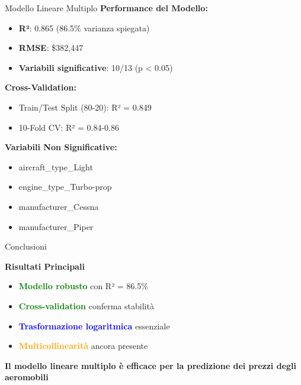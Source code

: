 \documentclass{beamer}
\begin{document}
\begin{frame}{Modello Lineare Multiplo}
\textbf{Performance del Modello:}
\begin{itemize}
    \item \textbf{R²}: 0.865 (86.5\% varianza spiegata)
    \item \textbf{RMSE}: \$382,447
    \item \textbf{Variabili significative}: 10/13 (p < 0.05)
\end{itemize}

\textbf{Cross-Validation:}
\begin{itemize}
    \item Train/Test Split (80-20): R² = 0.849
    \item 10-Fold CV: R² = 0.84-0.86
\end{itemize}

\textbf{Variabili Non Significative:}
\begin{itemize}
    \item aircraft\_type\_Light
    \item engine\_type\_Turbo-prop  
    \item manufacturer\_Cessna
    \item manufacturer\_Piper
\end{itemize}
\end{frame}

\begin{frame}{Conclusioni}
\begin{center}
\textbf{Risultati Principali}
\end{center}

\begin{itemize}
    \item \textcolor{green}{\textbf{Modello robusto}} con R² = 86.5\%
    \item \textcolor{green}{\textbf{Cross-validation}} conferma stabilità
    \item \textcolor{blue}{\textbf{Trasformazione logaritmica}} essenziale
    \item \textcolor{orange}{\textbf{Multicollinearità}} ancora presente
\end{itemize}

\vspace{1cm}
\begin{center}
\textbf{Il modello lineare multiplo è efficace per la predizione dei prezzi degli aeromobili}
\end{center}
\end{frame}
\end{document}
